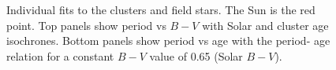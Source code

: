 \documentclass[11pt,preprint]{aastex}
\begin{document}
\begin{figure}[ht]
\begin{center}
    \end{center}
    \caption{ Individual fits to the clusters and field stars. The Sun is the
	    red point. Top panels show period vs $B-V$ with Solar and cluster
	    age isochrones. Bottom panels show period vs age with the period-
	    age relation for a constant $B-V$ value of 0.65 (Solar $B-V$).
\label{fig:subfigures2}}
\end{figure}
\end{document}
